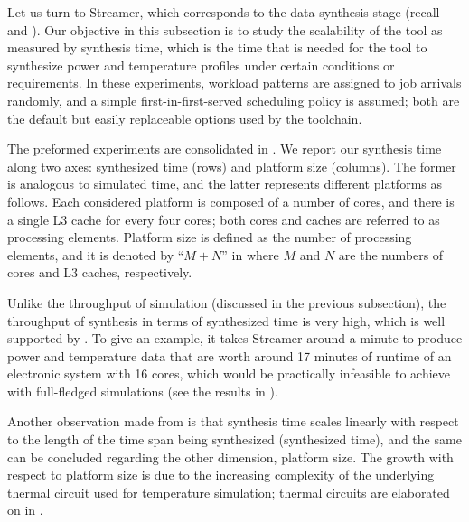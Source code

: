
Let us turn to Streamer, which corresponds to the data-synthesis stage (recall
 and ). Our objective in this subsection is to
study the scalability of the tool as measured by synthesis time, which is the
time that is needed for the tool to synthesize power and temperature profiles
under certain conditions or requirements. In these experiments, workload
patterns are assigned to job arrivals randomly, and a simple
first-in-first-served scheduling policy is assumed; both are the default but
easily replaceable options used by the toolchain.

The preformed experiments are consolidated in . We report our
synthesis time along two axes: synthesized time (rows) and platform size
(columns). The former is analogous to simulated time, and the latter represents
different platforms as follows. Each considered platform is composed of a number
of cores, and there is a single L3 cache for every four cores; both cores and
caches are referred to as processing elements. Platform size is defined as the
number of processing elements, and it is denoted by ``$M + N$'' in
 where $M$ and $N$ are the numbers of cores and L3 caches,
respectively.

Unlike the throughput of simulation (discussed in the previous subsection), the
throughput of synthesis in terms of synthesized time is very high, which is well
supported by . To give an example, it takes Streamer around a
minute to produce power and temperature data that are worth around 17 minutes of
runtime of an electronic system with 16 cores, which would be practically
infeasible to achieve with full-fledged simulations (see the results in
).

Another observation made from  is that synthesis time scales
linearly with respect to the length of the time span being synthesized
(synthesized time), and the same can be concluded regarding the other dimension,
platform size. The growth with respect to platform size is due to the increasing
complexity of the underlying thermal  circuit used for temperature
simulation; thermal circuits are elaborated on in .
